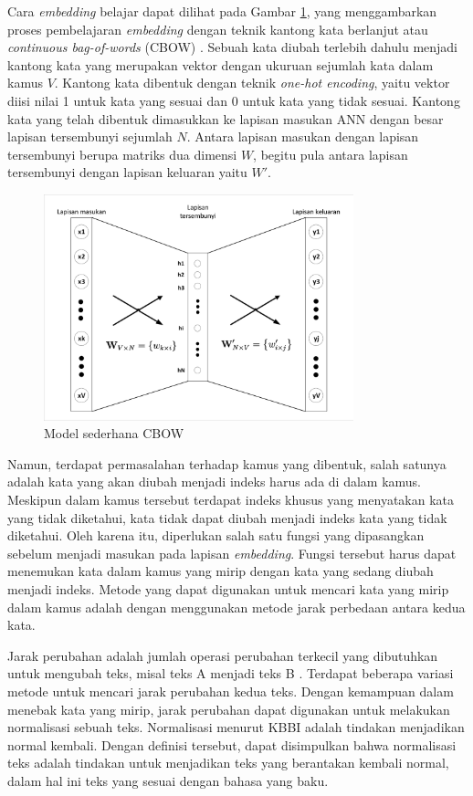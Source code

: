 Cara \textit{embedding} belajar dapat dilihat pada Gambar \ref{fig:cbow}, yang menggambarkan proses pembelajaran \textit{embedding} dengan teknik kantong kata berlanjut atau \textit{continuous bag-of-words} (CBOW) \parencite{Rong2014word2vecPL}. Sebuah kata diubah terlebih dahulu menjadi kantong kata yang merupakan vektor dengan ukuruan sejumlah kata dalam kamus $V$. Kantong kata dibentuk dengan teknik \textit{one-hot encoding}, yaitu vektor diisi nilai 1 untuk kata yang sesuai dan 0 untuk kata yang tidak sesuai. Kantong kata yang telah dibentuk dimasukkan ke lapisan masukan ANN dengan besar lapisan tersembunyi sejumlah $N$. Antara lapisan masukan dengan lapisan tersembunyi berupa matriks dua dimensi $W$, begitu pula antara lapisan tersembunyi dengan lapisan keluaran yaitu $W'$.
\begin{figure}[ht]
	\centering
	\includegraphics[width=0.8\textwidth, trim=2 2 2 2, clip]{resources/2/cbow.pdf}
	\caption{Model sederhana CBOW \parencite{Rong2014word2vecPL}}
	\label{fig:cbow}
\end{figure}

Namun, terdapat permasalahan terhadap kamus yang dibentuk, salah satunya adalah kata yang akan diubah menjadi indeks harus ada di dalam kamus. Meskipun dalam kamus tersebut terdapat indeks khusus yang menyatakan kata yang tidak diketahui, kata tidak dapat diubah menjadi indeks kata yang tidak diketahui. Oleh karena itu, diperlukan salah satu fungsi yang dipasangkan sebelum menjadi masukan pada lapisan \textit{embedding}. Fungsi tersebut harus dapat menemukan kata dalam kamus yang mirip dengan kata yang sedang diubah menjadi indeks. Metode yang dapat digunakan untuk mencari kata yang mirip dalam kamus adalah dengan menggunakan metode jarak perbedaan antara kedua kata.

Jarak perubahan adalah jumlah operasi perubahan terkecil yang dibutuhkan untuk mengubah teks, misal teks A menjadi teks B \parencite{schutze2008introduction}. Terdapat beberapa variasi metode untuk mencari jarak perubahan kedua teks. Dengan kemampuan dalam menebak kata yang mirip, jarak perubahan dapat digunakan untuk melakukan normalisasi sebuah teks. Normalisasi menurut KBBI \parencite{kbbi} adalah tindakan menjadikan normal kembali. Dengan definisi tersebut, dapat disimpulkan bahwa normalisasi teks adalah tindakan untuk menjadikan teks yang berantakan kembali normal, dalam hal ini teks yang sesuai dengan bahasa yang baku.

